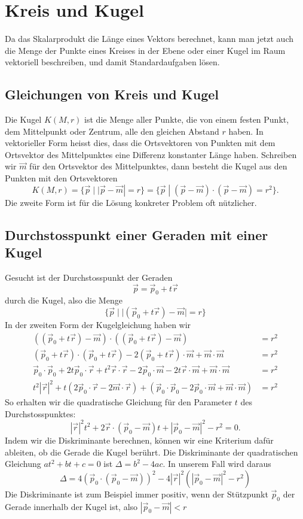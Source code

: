 \section{Kreis und Kugel}
Da das Skalarprodukt die Länge eines Vektors berechnet, kann man
jetzt auch die Menge der Punkte eines Kreises in der Ebene
oder einer Kugel im Raum vektoriell beschreiben, und damit Standardaufgaben
lösen.
\subsection{Gleichungen von Kreis und Kugel}
Die Kugel $K(M,r)$ ist die Menge aller Punkte, die von einem festen Punkt, dem
Mittelpunkt oder Zentrum, alle den gleichen Abstand $r$ haben.
In vektorieller
Form heisst dies, dass die Ortsvektoren von Punkten mit dem Ortsvektor des
Mittelpunktes eine Differenz konstanter Länge haben.
Schreiben wir $\vec m$
für den Ortsvektor des Mittelpunktes, dann besteht die Kugel aus den
Punkten mit den Ortsvektoren
\[
K(M,r)
=
\{\vec p\;| \;|\vec p-\vec m|=r\}
=
\{\vec p\;| \;(\vec p-\vec m)\cdot(\vec p-\vec m)=r^2\}.
\]
Die zweite Form ist für die Lösung konkreter Problem oft nützlicher.
\subsection{Durchstosspunkt einer Geraden mit einer Kugel
\label{durchstosspunktkugel}}
Gesucht ist der Durchstosspunkt der Geraden
\[
\vec p=\vec p_0+t\vec r
\]
durch die Kugel, also die Menge
\[
\{\vec p\;| \;|(\vec p_0+t\vec r)-\vec m|=r\}
\]
In der zweiten Form der Kugelgleichung haben wir
\begin{align*}
((\vec p_0+t\vec r)-\vec m)
\cdot
((\vec p_0+t\vec r)-\vec m)&=r^2
\\
(\vec p_0+t\vec r)
\cdot
(\vec p_0+t\vec r)
-2
(\vec p_0+t\vec r)\cdot \vec m
+\vec m\cdot\vec m&=r^2
\\
\vec p_0\cdot\vec p_0
+2t\vec p_0\cdot\vec r
+t^2\vec r\cdot\vec r
-2\vec p_0\cdot\vec m
-2t\vec r\cdot\vec m
+\vec m\cdot\vec m&=r^2
\\
t^2|\vec r|^2
+t(2\vec p_0\cdot\vec r-2\vec m\cdot\vec r)
+(\vec p_0\cdot\vec p_0-2\vec p_0\cdot\vec m+\vec m\cdot\vec m)&=r^2
\end{align*}
So erhalten wir die quadratische Gleichung für den Parameter $t$
des Durchstosspunktes:
\[
|\vec r|^2t^2
+2\vec r\cdot(\vec p_0-\vec m)t
+|\vec p_0-\vec m|^2-r^2 =0.
\]
Indem wir die Diskriminante berechnen,  können wir eine Kriterium
dafür ableiten, ob die Gerade die Kugel berührt.
Die Diskriminante
der quadratischen Gleichung $at^2+bt+c=0$ ist $\Delta = b^2-4ac$.
In unserem
Fall wird daraus
\[
\Delta
=
4(\vec p_0\cdot(\vec p_0-\vec m))^2-
4|\vec r|^2(
|\vec p_0-\vec m|^2-r^2
)
\]
Die Diskriminante ist zum Beispiel immer positiv, wenn der Stützpunkt
$\vec p_0$
der Gerade innerhalb der Kugel ist, also $|\vec p_0-\vec m|<r$
